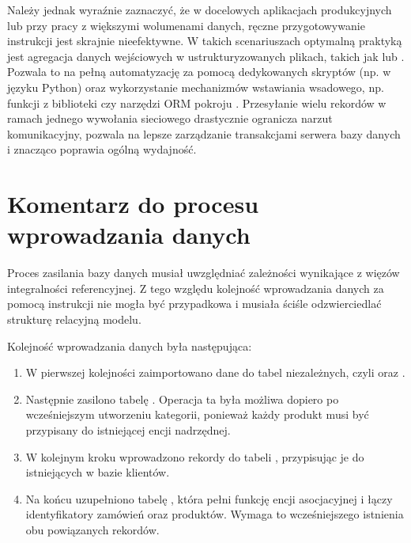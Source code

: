 \documentclass[a4paper,11pt,english,openany,oneside]{sphinxmanual}
\begin{document}
\sphinxAtStartPar
Należy jednak wyraźnie zaznaczyć, że w docelowych aplikacjach produkcyjnych lub przy pracy z większymi wolumenami danych, ręczne przygotowywanie instrukcji  jest skrajnie nieefektywne. W takich scenariuszach optymalną praktyką jest agregacja danych wejściowych w ustrukturyzowanych plikach, takich jak  lub . Pozwala to na pełną automatyzację za pomocą dedykowanych skryptów (np. w języku Python) oraz wykorzystanie mechanizmów wstawiania wsadowego, np. funkcji  z biblioteki  czy narzędzi ORM pokroju . Przesyłanie wielu rekordów w ramach jednego wywołania sieciowego drastycznie ogranicza narzut komunikacyjny, pozwala na lepsze zarządzanie transakcjami serwera bazy danych i znacząco poprawia ogólną wydajność.


\section{Komentarz do procesu wprowadzania danych}
\label{\detokenize{rozdzial_4/index:komentarz-do-procesu-wprowadzania-danych}}
\sphinxAtStartPar
Proces zasilania bazy danych musiał uwzględniać zależności wynikające z więzów integralności referencyjnej. Z tego względu kolejność wprowadzania danych za pomocą instrukcji  nie mogła być przypadkowa i musiała ściśle odzwierciedlać strukturę relacyjną modelu.

\sphinxAtStartPar
Kolejność wprowadzania danych była następująca:
\begin{enumerate}
%
\item {} 
\sphinxAtStartPar
W pierwszej kolejności zaimportowano dane do tabel niezależnych, czyli  oraz .

\item {} 
\sphinxAtStartPar
Następnie zasilono tabelę . Operacja ta była możliwa dopiero po wcześniejszym utworzeniu kategorii, ponieważ każdy produkt musi być przypisany do istniejącej encji nadrzędnej.

\item {} 
\sphinxAtStartPar
W kolejnym kroku wprowadzono rekordy do tabeli , przypisując je do istniejących w bazie klientów.

\item {} 
\sphinxAtStartPar
Na końcu uzupełniono tabelę , która pełni funkcję encji asocjacyjnej i łączy identyfikatory zamówień oraz produktów. Wymaga to wcześniejszego istnienia obu powiązanych rekordów.

\end{enumerate}
\end{document}
